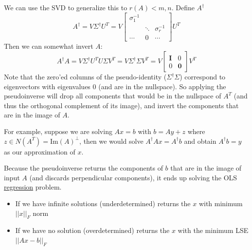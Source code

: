 \documentclass[12pt]{article} %
\begin{document}
We can use the SVD to generalize this to $r(A) < m,n$. Define $A^\dagger$
\begin{equation*}
    A^\dagger = V \Sigma^\dagger U^T = V 
    \begin{bmatrix}
    \sigma_1^{-1} & & \\
    & \ddots & \sigma_r^{-1} \\
    \cdots & 0 & \cdots
    \end{bmatrix}
    U^T
\end{equation*}
Then we can somewhat invert $A$:
\begin{equation*}
    A^{\dagger}A = V \Sigma^\dagger U^T U \Sigma V^T = V \Sigma^\dagger \Sigma V^T = V
    \begin{bmatrix}
    \textbf{I} & 0 \\
    0 & \textbf{0}
    \end{bmatrix}
    V^T
\end{equation*}
Note that the zero'ed columns of the pseudo-identity ($\Sigma^\dagger \Sigma$) correspond to eigenvectors with eigenvalues 0 (and are in the nullspace). So applying the pseudoinverse will drop all components that would be in the nullspace of $A^T$ (and thus the orthogonal complement of its image), and invert the components that are in the image of $A$. 

For example, suppose we are solving $Ax = b$ with $b = Ay + z$ where $z \in N(A^T) = \text{Im}(A)^\perp$, then we would solve $A^\dagger A x = A^\dagger b$ and obtain $A^\dagger b = y$ as our approximation of $x$.

Because the pseudoinverse returns the components of $b$ that are in the image of input $A$ (and discards perpendicular components), it ends up solving the OLS \href{https://www.youtube.com/watch?v=PjeOmOz9jSY}{regression} problem.
\begin{itemize}[topsep=-1pt,itemsep=-1pt]
    \item If we have infinite solutions (underdetermined) returns the $x$ with minimum $||x||_F$ norm
    \item If we have no solution (overdetermined) returns the $x$ with the minimum LSE $||Ax - b||_F$
\end{itemize}
\end{document}
